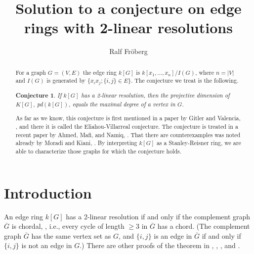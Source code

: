 \documentclass[11pt, oneside]{article}   	%
\title{Solution to a conjecture on edge rings with 2-linear resolutions}
\author{Ralf Fr\"oberg}
\date{}							%
\begin{document}
\newtheorem{theorem}{Theorem}

\newtheorem{lemma}[theorem]{Lemma}

\newtheorem{cor}{Corollary}

\newtheorem*{conj}{Conjecture}

\newtheorem{definition}[theorem]{Definition}

\newtheorem{rmk}{Remark}

\maketitle
\begin{abstract}
For a graph $G=(V,E)$ the edge ring $k[G]$ is $k[x_1,\ldots,x_n]/I(G)$, where $n=|V|$ and $I(G)$ is generated by $\{ x_ix_j;\{ i,j\}\in E\}$.
The conjecture we treat is the following. 

\medskip
\begin{conj} If $k[G]$ has a 2-linear resolution, then the projective dimension of $K[G]$, pd$(k[G])$, equals the maximal degree of a vertex in $G$.
\end{conj}

As far as we know,
this conjecture is first mentioned in a paper by Gitler and Valencia, \cite[Conjecture 4.13]{g-v}, and there it is called the Eliahou-Villarreal conjecture. 
The conjecture is treated in a recent paper by Ahmed, Mafi, and Namiq, \cite{a-m-n}. That there are counterexamples was noted already by
Moradi and Kiani, \cite{k-m}. By interpreting $k[G]$ as a Stanley-Reisner ring, we are able
to characterize those graphs for which the conjecture holds.
\end{abstract}

\section{Introduction}
An edge ring $k[G]$ has a 2-linear resolution if and only if the complement graph $\overline G$ is chordal, \cite[Theorem 1]{f1}, i.e., every cycle of length $\ge3$ in 
$\overline G$ has a chord. (The complement graph $\overline G$ has the same vertex set as $G$, and $\{ i,j\}$ is an edge in $\overline G$ if and only
if $\{ i,j\}$ is not an edge in $G$.) There are other proofs of the theorem in \cite[Theorem 2.1]{e-g}, \cite[[Theorem 3.4]{d-e}, \cite[Corollary 3.3]{n}, and \cite[Theorem 9.2.12]{h-h}.
\end{document}
